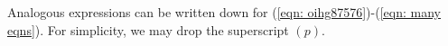 Analogous expressions can be written down for (\ref{eqn: oihg87576})-(\ref{eqn: many eqns}). For simplicity, we may drop the superscript \((p)\). 
%



